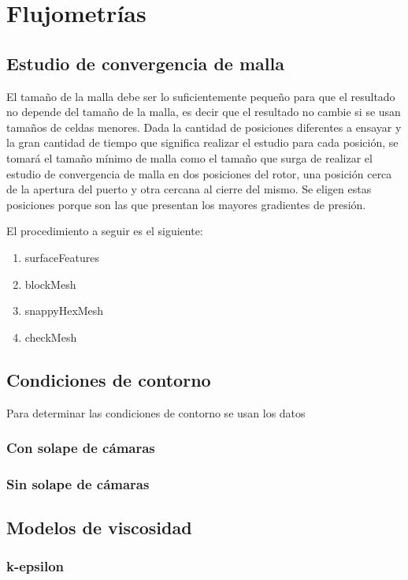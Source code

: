 \section{Flujometrías}

\subsection{Estudio de convergencia de malla}

El tamaño de la malla debe ser lo suficientemente pequeño para que el resultado
no depende del tamaño de la malla, es decir que el resultado no cambie si se
usan tamaños de celdas menores.
%
Dada la cantidad de posiciones diferentes a ensayar y la gran cantidad de
tiempo que significa realizar el estudio para cada posición, se tomará el
tamaño mínimo de malla como el tamaño que surga de realizar el estudio de
convergencia de malla en dos posiciones del rotor, una posición cerca de la
apertura del puerto y otra cercana al cierre del mismo.
%
Se eligen estas posiciones porque son las que presentan los mayores gradientes
de presión.


El procedimiento a seguir es el siguiente:
\begin{enumerate}
    \item surfaceFeatures
    \item blockMesh
    \item snappyHexMesh
    \item checkMesh
\end{enumerate}


\subsection{Condiciones de contorno}
Para determinar las condiciones de contorno se usan los datos 
\subsubsection{Con solape de cámaras}
\subsubsection{Sin solape de cámaras}

\subsection{Modelos de viscosidad}
\subsubsection{k-epsilon}
